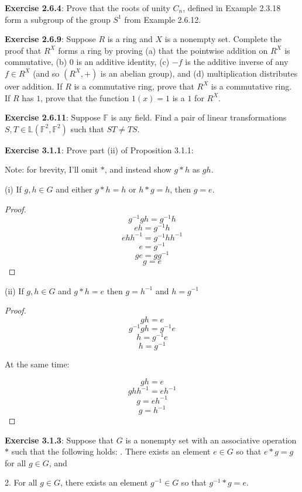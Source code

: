\documentclass[a4paper]{article}
\begin{document}
\begin{myparindent}{0pt}
\textbf{Exercise 2.6.4}:
Prove that the roots of unity $C_n$, defined in Example 2.3.18 form a subgroup
of the group $S^1$ from Example 2.6.12. \newline

\textbf{Exercise 2.6.9}:
Suppose $R$  is a ring and $X$ is a nonempty set. Complete the proof that $R^X$
forms a ring by proving (a) that the pointwise addition on $R^X$ is commutative,
(b) 0 is an additive identity, (c) $-f$ is the additive inverse of any
$f \in R^X$ (and so $(R^X, +)$ is an abelian group), and (d) multiplication
distributes over addition. If $R$ is a commutative ring, prove that $R^X$ is a
commutative ring. If $R$ has $1$, prove that the function $1(x) = 1$ is a $1$
for $R^X$. \newline

\textbf{Exercise 2.6.11}:
Suppose $\mathbb{F}$ is any field. Find a pair of linear transformations
$S, T \in \mathbb{L}(\mathbb{F}^2, \mathbb{F}^2)$ such that $ST \neq TS$.
\newline

\textbf{Exercise 3.1.1}:
Prove part (ii) of Proposition 3.1.1: \newline

Note: for brevity, I'll omit $*$, and instead show $g * h$ as $gh$.

(i) If $g, h \in G$ and either $g * h = h$ or $h * g = h$, then $g = e$.
\begin{proof}
  \[ g^{-1}gh = g^{-1}h \]
  \[ eh = g^{-1}h \]
  \[ ehh^{-1} = g^{-1}hh^{-1} \]
  \[ e = g^{-1} \]
  \[ ge = gg^{-1} \]
  \[ g = e \]
\end{proof}

(ii) If $g, h \in G$ and $g * h = e$ then $g = h^{-1}$ and $h = g^{-1}$
\begin{proof}
  \[ gh = e \]
  \[ g^{-1}gh = g^{-1}e \]
  \[ h = g^{-1}e \]
  \[ h = g^{-1} \]

  At the same time:

  \[ gh = e \]
  \[ ghh^{-1} = eh^{-1} \]
  \[ g = eh^{-1} \]
  \[ g = h^{-1} \]
\end{proof}

\textbf{Exercise 3.1.3}:
Suppose that $G$ is a nonempty set with an associative operation $*$ such that
the following holds: . There exists an element $e \in G$ so that $e * g = g$ for all $g \in G$, and

2. For all $g \in G$, there exists an element $g^{-1} \in G$ so that
$g^{-1} * g = e$.


\end{myparindent}
\end{document}
